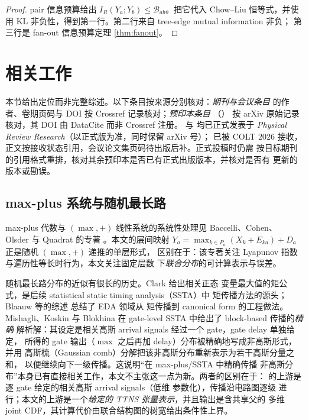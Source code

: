 \documentclass[a4paper,11pt]{article}
\theoremstyle{definition}
\newcommand{\1}{\mathbf 1}
\begin{document}
\begin{proof}
pair 信息预算给出
$I_R(Y_a;Y_b)\le\mathcal B_{ab}$。把它代入 Chow--Liu 恒等式，并使用
KL 非负性，得到第一行。第二行来自 tree-edge mutual information 非负；
第三行是 fan-out 信息预算定理 \ref{thm:fanout}。
\end{proof}

\section{相关工作}
\label{sec:related}

本节给出定位而非完整综述。以下条目按来源分别核对：\emph{期刊与会议条目}
的作者、卷期页码与 DOI 按 Crossref 记录核对；\emph{预印本条目}
（\cite{Ando2019,Ando2026,Mishagli2024,Yuan2026}）
按 arXiv 原始记录核对，其 DOI 由 DataCite 而非 Crossref 注册。
\cite{RoaVillescas2024} 与 \cite{Peng2023} 均已正式发表于
\emph{Physical Review Research}（以正式版为准，同时保留 arXiv 号）；\cite{Dmitriev2026} 已被 COLT 2026
接收，正文按接收状态引用，会议论文集页码待出版后补。正式投稿时仍需
按目标期刊的引用格式重排，核对其余预印本是否已有正式出版版本，并核对是否有
更新的版本或勘误。

\subsection{max-plus 系统与随机最长路}

max-plus 代数与 $(\max,+)$ 线性系统的系统性处理见 Baccelli、Cohen、
Olsder 与 Quadrat 的专著 \cite{Baccelli1992}。本文的层间映射
$Y_a=\max_{k\in P_a}(X_k+E_{ka})+D_a$ 正是随机 $(\max,+)$ 递推的单层形式，
区别在于：该专著关注 Lyapunov 指数与遍历性等长时行为，本文关注固定层数
下\emph{联合分布}的可计算表示与误差。

随机最长路分布的近似有很长的历史。Clark \cite{Clark1961} 给出相关正态
变量最大值的矩公式，是后续 statistical static timing analysis（SSTA）中
矩传播方法的源头；Blaauw 等的综述 \cite{Blaauw2008} 总结了 EDA 领域从
矩传播到 canonical form 的工程做法。Mishagli、Koskin 与 Blokhina
\cite{Mishagli2024} 在 gate-level SSTA 中给出了 block-based 传播的\emph{精确}
解析解：其设定是相关高斯 arrival signals 经过一个 gate，gate delay 单独给定，
所得的 gate 输出（$\max$ 之后再加 delay）分布被精确地写成非高斯形式，并用
高斯梳（Gaussian comb）分解把该非高斯分布重新表示为若干高斯分量之和，
以便继续向下一级传播。这说明“在 max-plus/SSTA 中精确传播
非高斯分布”本身已有直接相关工作，本文不主张这一点为新。两者的区别在于：
\cite{Mishagli2024} 的上游是逐 gate 给定的相关高斯 arrival signals（低维
参数化），传播沿电路图逐级
进行；本文的上游是一个\emph{给定的 TTNS 张量表示}，并且输出是含共享父的
多维 joint CDF，其计算代价由联合结构图的树宽给出条件性上界。
\end{document}
